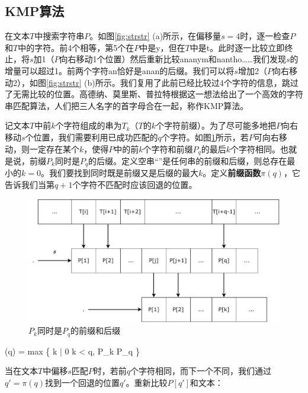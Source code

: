 \documentclass[b5paper]{ctexart}
\begin{document}
\subsection{KMP算法}
 

在文本$T$中搜索字符串$P$。如图\ref{fig:strstr} (a)所示，在偏移量$s=4$时，逐一检查$P$和$T$中的字符。前4个相等，第5个在$P$中是y，但在$T$中是t。此时逐一比较立即终止，将$s$加1（$P$向右移动1个位置）然后重新比较ananym和nantho……我们发现$s$的增量可以超过1。前两个字符an恰好是anan的后缀。我们可以将$s$增加2（$P$向右移动2），如图\ref{fig:strstr} (b)所示。我们复用了此前已经比较过4个字符的信息，跳过了无需比较的位置。高德纳、莫里斯、普拉特根据这一想法给出了一个高效的字符串匹配算法\cite{kmp}，人们把三人名字的首字母合在一起，称作KMP算法。

记文本$T$中前$k$个字符组成的串为$T_k$（$T$的$k$个字符前缀）。为了尽可能多地把$P$向右移动$s$个位置，我们需要利用已成功匹配的$q$个字符。如图\ref{fig:kmp-fallback}所示，若$P$可向右移动，则一定存在某个$k$，使得$P$中的前$k$个字符和前缀$P_q$的最后$k$个字符相同。也就是说，前缀$P_k$同时是$P_q$的后缀。定义空串“”是任何串的前缀和后缀，则总存在最小的$k=0$。我们要找到同时既是前缀又是后缀的最大$k$。定义\textbf{前缀函数}$\pi(q)$，它告诉我们当第$q+1$个字符不匹配时应该回退的位置\cite{CLRS}。

\begin{figure}[htbp]
 \centering
 \includegraphics[scale=0.5]{img/kmp-fallback}
 \caption{$P_k$同时是$P_q$的前缀和后缀}
 \label{fig:kmp-fallback}
\end{figure}

\be
\pi(q) = max \{ k | 0 \leq k < q,  P_k  P_q \}
\label{eq:prefix-function}
\ee

当在文本$T$中偏移$s$匹配$P$时，若前$q$个字符相同，而下一个不同，我们通过$q' = \pi(q)$找到一个回退的位置$q'$。重新比较$P[q']$和文本：
\end{document}
